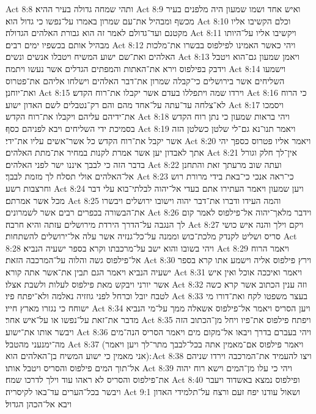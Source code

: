Act 8:8  ותהי שמחה גדולה בעיר ההיא׃
Act 8:9  ואיש אחד ושמו שמעון היה מלפנים בעיר מכשף ומבהיל את־עם שמרון באמרו על־נפשו כי גדול הוא׃
Act 8:10  וכלם הקשיבו אליו מקטנם ועד־גדולם לאמר זה הוא גבורת האלהים הגדולה׃
Act 8:11  ויקשיבו אליו על־היותו מבהיל אותם בכשפיו ימים רבים׃
Act 8:12  ויהי כאשר האמינו לפילפוס בבשרו את־מלכות האלהים ואת־שם ישוע המשיח ויטבלו אנשים ונשים׃
Act 8:13  ויאמן שמעון גם־הוא ויטבל וידבק בפילפוס וירא את־האתות והמפתים הגדלים אשר נעשו ויתמה׃
Act 8:14  וישמעו השליחים אשר בירושלים כי־קבלה שמרון את־דבר האלהים וישלחו אליהם את־פטרוס ואת־יוחנן׃
Act 8:15  וירדו שמה ויתפללו בעדם אשר יקבלו את־רוח הקדש׃
Act 8:16  כי הרוח לא־צלחה עד־עתה על־אחד מהם והם רק־נטבלים לשם האדון ישוע׃
Act 8:17  ויסמכו את־ידיהם עליהם ויקבלו את־רוח הקדש׃
Act 8:18  ויהי בראות שמעון כי נתן רוח הקדש בסמיכת ידי השליחים ויבא לפניהם כסף׃
Act 8:19  ויאמר תנו־נא גם־לי שלטן כשלטן הזה אשר יקבל את־רוח הקדש כל אשר־אשים עליו את־ידי׃
Act 8:20  ויאמר אליו פטרוס כספך יהי אתך לאבדון יען אשר אמרת לקנות במחיר את־מתת האלהים׃
Act 8:21  אין־לך חלק וגורל בדבר הזה כי לבבך איננו ישר לפני האלהים׃
Act 8:22  ועתה שוב מרעתך זאת והתחנן אל־האלהים אולי תסלח לך מזמת לבבך׃
Act 8:23  כי־ראה אנכי כי־באת בידי מרורת רוש וחרצבות רשע׃
Act 8:24  ויען שמעון ויאמר העתירו אתם בעדי אל־יהוה לבלתי־בוא עלי דבר מכל אשר אמרתם׃
Act 8:25  והמה העידו ודברו את־דבר יהוה וישובו ירושלים ויבשרו את־הבשורה בכפרים רבים אשר לשמרונים׃
Act 8:26  וידבר מלאך־יהוה אל־פילפוס לאמר קום לך הנגבה על־הדרך הירדת מירושלים עזתה והיא חרבה׃
Act 8:27  ויקם וילך והנה איש כושי סריס ושליט לקנדק מלכת־כוש וממנה על־כל־גנזיה אשר עלה אל־ירושלים להשתחות׃
Act 8:28  ויהי בשובו והוא ישב על־מרכבתו וקרא בספר ישעיה הנביא׃
Act 8:29  ויאמר הרוח אל־פילפוס גשה והלוה על־המרכבה הזאת׃
Act 8:30  וירץ פילפוס אליה וישמע אתו קרא בספר ישעיה הנביא ויאמר הגם תבין את־אשר אתה קורא׃
Act 8:31  ויאמר ואיככה אוכל ואין איש אשר יורני ויבקש מאת פילפוס לעלות ולשבת אצלו׃
Act 8:32  וזה ענין הכתוב אשר קרא כשה לטבח יובל וכרחל לפני גוזזיה נאלמה ולא־יפתח פיו׃
Act 8:33  בעצר משפטו לקח ואת־דורו מי ישוחח כי נגזרו מארץ חייו׃
Act 8:34  ויען הסריס ויאמר אל־פילפוס אשאלה ממך על־מי הנביא מדבר את־זאת על־נפשו או על־איש אחר׃
Act 8:35  ויפתח פילפוס את־פיו ויחל מן־הכתוב הזה ויבשר אותו את־ישוע׃
Act 8:36  ויהי בעברם בדרך ויבאו אל־מקום מים ויאמר הסריס הנה־מים מה־ימנעני מהטבל׃
Act 8:37  (ויאמר פילפוס אם־מאמין אתה בכל־לבבך מתר־לך ויען ויאמר אני מאמין כי ישוע המשיח בן־האלהים הוא)׃
Act 8:38  ויצו להעמיד את־המרכבה וירדו שניהם אל־תוך המים פילפוס והסריס ויטבל אותו׃
Act 8:39  ויהי כי עלו מן־המים וישא רוח יהוה את־פילפוס והסריס לא ראהו עוד וילך לדרכו שמח׃
Act 8:40  ופילפוס נמצא באשדוד ויעבר ויבשר בכל־הערים עד־באו לקיסריה׃
Act 9:1  ושאול עודנו יפח זעם ורצח על־תלמידי האדון ויבא אל־הכהן הגדול׃
